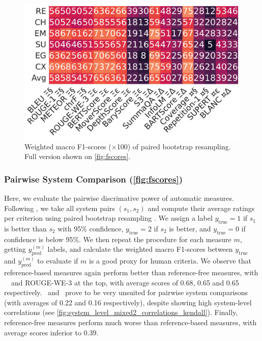 \begin{figure}[h]
\centering
\includegraphics[width=\columnwidth]{pictures/bootstrap_fscores_filtered.pdf}
\caption{Weighted macro F1-scores ($\times$100) of paired bootstrap resampling. Full version shown on \autoref{fig:fscores}.}
\label{fig:fscores2}
\end{figure}

\subsubsection{Pairwise System Comparison (\autoref{fig:fscores})}

Here, we evaluate the pairwise discrimative power of automatic measures. Following \citet{bhandari2020re}, we take all system pairs $(s_1, s_2)$ and compute their average ratings per criterion using paired bootstrap resampling \citep{koehn-2004-statistical, dror-etal-2018-hitchhikers}. We assign a label $y_\mathrm{true} = 1$ if $s_1$ is better than $s_2$ with 95\% confidence, $y_\mathrm{true} = 2$ if $s_2$ is better, and $y_\mathrm{true} = 0$ if confidence is below 95\%. We then repeat the procedure for each measure $m$, getting $y_\mathrm{pred}^{(m)}$ labels, and calculate the weighted macro F1-scores \citep{goutte2005probabilistic} between $y_\mathrm{true}$ and $y_\mathrm{pred}^{(m)}$ to evaluate if $m$ is a good proxy for human criteria. We observe that reference-based measures again perform better than reference-free measures, with \bartscore\, \sthree\ and \textsc{ROUGE-WE-3} at the top, with average scores of 0.68, 0.65 and 0.65 respectively. \depth\ and \bary\ prove to be very unsuited for pairwise system comparisons (with averages of 0.22 and 0.16 respectively), despite showing high system-level correlations (see \autoref{fig:system_level_mixed2_correlations_kendall}). Finally, reference-free measures perform much worse than reference-based measures, with average scores inferior to 0.39.

